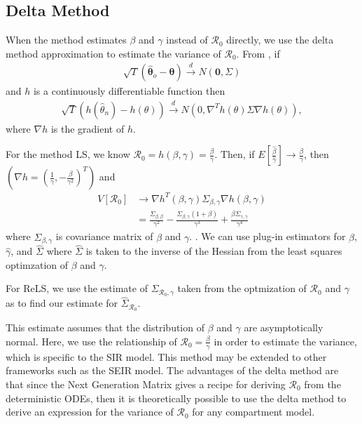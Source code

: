 \documentclass[12pt]{article}
\newcommand{\rr}{\ensuremath{\mathcal{R}_0}}
\begin{document}
\subsection{Delta Method}\label{delta-method}

When the method estimates \(\beta\) and \(\gamma\) instead of \(\rr\) directly, we use the delta method approximation to estimate the
variance of \(\rr\).   From \cite{wasserman2004}, if
\begin{align*}
  \sqrt{T} \left ( \hat{\mathbf{\theta}}_o - \mathbf{\theta} \right ) \overset{d}{\to} N\left ( \mathbf{0}, \Sigma \right  )
\end{align*}
and $h$ is a continuously differentiable function then
\begin{align*}
  \sqrt{T} \left (h(\hat{\theta}_n) - h(\theta) \right ) \overset{d}{\to} N \left (0,  \nabla^T h(\theta)\Sigma \nabla h(\theta)\right ),
\end{align*}
where $\nabla h$ is the gradient of $h$.

For the method LS, we know $\rr = h(\beta, \gamma) = \frac{\beta}{\gamma}$. Then, if $E\left [\frac{\hat{\beta}}{\hat{\gamma}}\right] \to \frac{\beta}{\gamma}$, then  $(\nabla h = (\frac{1}{\gamma},  -\frac{\beta}{\gamma^2})^T)$ and
\begin{align*}
  V[\rr] &\to \nabla h^T(\beta, \gamma) \Sigma_{\beta, \gamma} \nabla h(\beta, \gamma) \\
  &= \frac{\Sigma_{\beta, \beta}}{\gamma^2} - \frac{\Sigma_{\beta, \gamma}(1 + \beta)}{\gamma^3} + \frac{\beta \Sigma_{\gamma, \gamma}}{\gamma^4}
\end{align*}
where $\Sigma_{\beta, \gamma}$ is covariance matrix of \(\beta\) and \(\gamma\). .  We can use plug-in estimators for $\hat{\beta}$, $\hat{\gamma}$, and $\hat{\Sigma}$ where $\hat{\Sigma}$ is taken to the inverse of the Hessian from the least squares optimzation of $\beta$ and $\gamma$.

For ReLS, we use the estimate of $\Sigma_{\rr, \gamma}$ taken from the optmization of $\rr$ and $\gamma$ as to find our estimate for $\hat{\Sigma}_{\rr}$.

This estimate assumes that the distribution of $\beta$ and $\gamma$ are asymptotically normal.  Here, we use the relationship of $\rr = \frac{\beta}{\gamma}$ in order to estimate the variance, which is specific to the SIR model.  This method may be extended to other frameworks such as the SEIR model.  The advantages of the delta method are that since the Next Generation Matrix \citep{diekmann2009} gives a recipe for deriving $\rr$ from the deterministic ODEs, then it is theoretically possible to use the delta method to derive an expression for the variance of $\rr$ for any compartment model.
\end{document}
